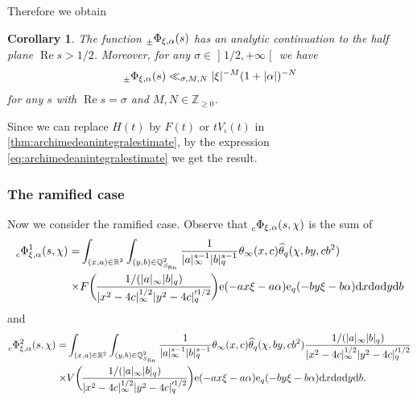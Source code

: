 \documentclass[10pt,oneside,reqno]{amsart}
\makeatletter
\newcommand\lopen{\mathopen{]}}
\newcommand\ropen{\mathclose{[}}
\newcommand\rmd{\mathrm{d}}
\newcommand\rme{\mathrm{e}}
\newcommand\QQ{\mathbb{Q}}
\newcommand\RR{\mathbb{R}}
\newcommand\ZZ{\mathbb{Z}}
\renewcommand\Re{\mathop{\mathrm{Re}}}
\newcommand\fin{\mathrm{fin}}
\renewcommand\geq{\geqslant}
\newcommand\legendresymbol[2]{\genfrac{(}{)}{}{}{#1}{#2}}
\theoremstyle{THEOREM}
\newtheorem{corollary}[theorem]{Corollary}
\theoremstyle{DEFINITION}
\theoremstyle{EXERCISE}
\numberwithin{equation}{section}
\renewenvironment{proof}[1][\proofname]{\par
  \vspace{-6pt}
  \pushQED{\qed}
  \normalfont \topsep6\p@\@plus6\p@\relax
  \trivlist
  \item[\hskip\labelsep\rmfamily\bfseries
    #1\@addpunct{:}]\ignorespaces
}{
  \popQED\endtrivlist\@endpefalse
  \vspace{-6pt}
}
\makeatother
\begin{document}
Therefore we obtain
\begin{corollary}
The function $\prescript{}{\pm}\Phi_{\xi,\alpha}(s)$ has an analytic continuation to the half plane $\Re s>1/2$. Moreover, for any $\sigma\in \lopen 1/2,+\infty\ropen$ we have
\[
\prescript{}{\pm}\Phi_{\xi,\alpha}(s)\ll_{\sigma,M,N} |\xi|^{-M}(1+|\alpha|)^{-N}
\]
for any $s$ with $\Re s=\sigma$ and $M,N\in \ZZ_{\geq 0}$.
\end{corollary}
\begin{proof}
Since we can replace $H(t)$ by $F(t)$ or $tV_\iota(t)$ in \autoref{thm:archimedeanintegralestimate}, by the expression \eqref{eq:archimedeanintegralestimate} we get the result.
\end{proof}

\subsubsection{The ramified case}
Now we consider the ramified case.
Observe that $\prescript{}{c}\Phi_{\xi,\alpha}(s,\chi)$ is the sum of
\begin{align*}
\prescript{}{c}\Phi_{\xi,\alpha}^1(s,\chi)=& \int_{(x,a)\in\RR^2}\int_{(y,b)\in\QQ_{S_\fin}^2} \frac{1}{|a|_\infty^{s-1}|b|_q^{s-1}} \theta_\infty(x,c)\widehat{\theta}_{q}(\chi,by,cb^2) \\
\times&F\legendresymbol{1/(|a|_\infty|b|_q)}{|x^2-4c|_\infty^{1/2}|y^2- 4c|_q'^{1/2}}\rme(-ax\xi-a\alpha)\rme_{q}(-by\xi-b\alpha)\rmd x\rmd a\rmd y\rmd b
\end{align*}
and
\begin{align*}
\prescript{}{c}\Phi_{\xi,\alpha}^2(s,\chi)=& \int_{(x,a)\in\RR^2}\int_{(y,b)\in\QQ_{S_\fin}^2} \frac{1}{|a|_\infty^{s-1}|b|_q^{s-1}} \theta_\infty(x,c)\widehat{\theta}_{q}(\chi,by,cb^2) \frac{1/(|a|_\infty|b|_q)}{|x^2-4c|_\infty^{1/2}|y^2- 4c|_q'^{1/2}}\\
\times&V\legendresymbol{1/(|a|_\infty|b|_q)}{|x^2-4c|_\infty^{1/2}|y^2- 4c|_q'^{1/2}}\rme(-ax\xi-a\alpha)\rme_{q}(-by\xi-b\alpha)\rmd x\rmd a\rmd y\rmd b.
\end{align*}
\end{document}
